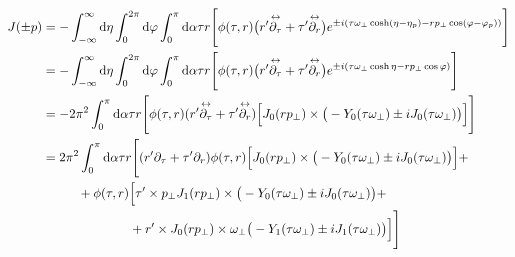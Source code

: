 \begin{subequations}
    \begin{align}
        J(\pm p) & =-\int_{-\infty}^\infty\text{d}\eta\int_0^{2\pi}\text{d}\varphi\int_0^\pi\text{d}\alpha\tau r\Bigg[\phi(\tau,r)\big(r^\prime\overset{\leftrightarrow}{\partial_\tau}+\tau^\prime\overset{\leftrightarrow}{\partial_r}\big)e^{\pm{i}(\tau \omega_\perp\cosh(\eta-\eta_p)-r p_\perp\cos(\varphi-\varphi_p))}\Bigg] \\
                           & =-\int_{-\infty}^\infty\text{d}\eta\int_0^{2\pi}\text{d}\varphi\int_0^\pi\text{d}\alpha\tau r\Bigg[\phi(\tau,r)\big(r^\prime\overset{\leftrightarrow}{\partial_\tau}+\tau^\prime\overset{\leftrightarrow}{\partial_r}\big)e^{\pm{i}(\tau \omega_\perp\cosh\eta-r p_\perp\cos\varphi)}\Bigg]                      \\
                           & =-2\pi^2\int_0^\pi\text{d}\alpha\tau r\Bigg[\phi(\tau,r)(r^\prime\overset{\leftrightarrow}{\partial_\tau}+\tau^\prime\overset{\leftrightarrow}{\partial_r})\Big[J_0(r p_\perp)\times\big(-Y_0(\tau\omega_\perp)\pm{i} J_0(\tau\omega_\perp)\big)\Big]\Bigg]                                                 \\
                           & =2\pi^2\int_0^\pi\text{d}\alpha\tau r\Bigg[(r^\prime\partial_\tau+\tau^\prime\partial_r)\phi(\tau,r)\Big[J_0(r p_\perp)\times\big(-Y_0(\tau\omega_\perp)\pm{i} J_0(\tau\omega_\perp)\big)\Big]+\nonumber                                                                                             \\
                           & \phantom{=}\qquad + \phi(\tau,r)\Big[\tau^\prime\times p_\perp J_1(r p_\perp)\times\big(-Y_0(\tau\omega_\perp)\pm{i} J_0(\tau\omega_\perp)\big)+\nonumber                                                                                                                                       \\
                           & \phantom{=}\qquad\phantom{+\phi(\tau,r)\Big[}+r^\prime\times J_0(r p_\perp)\times\omega_\perp\big(-Y_1(\tau\omega_\perp)\pm{i} J_1(\tau\omega_\perp)\big)\Big]\Bigg]
    \end{align}
\end{subequations}

